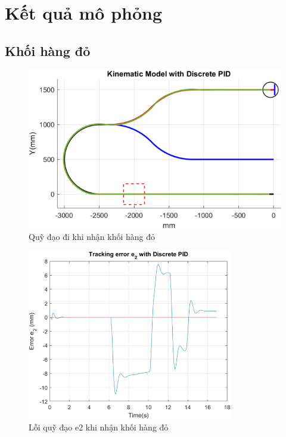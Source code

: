      \section{Kết quả mô phỏng}
     \newpage
          \subsection{Khối hàng đỏ}
               \begin{figure}[H]
                    \centering
                    \includegraphics[width=1\textwidth]{pictures/chapter8/trajec_red.png}
                    \caption{Quỹ đạo đi khi nhận khối hàng đỏ}
                    \label{tra_red}
               \end{figure}
               \begin{figure}[H]
                    \centering
                    \includegraphics[width=0.8\textwidth]{pictures/chapter8/err_red.png}
                    \caption{Lỗi quỹ đạo e2 khi nhận khối hàng đỏ}
                    \label{err_red}
               \end{figure}
